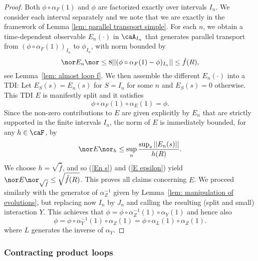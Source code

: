 \begin{proof}
	Both $\phi \circ \alpha_{F}(1)$ and $\phi$ are factorized exactly over intervals $I_n$. We consider each interval separately and we note that we are exactly in the framework of Lemma \ref{lem: parallel transport simple}. For each $n$, we obtain a time-dependent observable $E_{n}(\cdot)$ in $ \caA_{I_n}$
	that generates parallel transport from $(\phi \circ \alpha_{F}(1))_{I_n}$ to $\phi_{I_n}$, with norm bounded by 
	\begin{equation}\label{En s}
	\nor E_n \nor \leq 8 || (\phi \circ \alpha_{F}(1)-\phi)_{I_n}    || \leq  \hat{f}(R),
	\end{equation}
	see Lemma~\ref{lem: almost loop f}. We then assemble the different $E_n(\cdot)$ into a TDI: Let $
	E_S(s)= E_n(s) $ for $S=I_n$ for some $n$ and $E_S(s)=0$ otherwise.
	This TDI $E$ is manifestly split and it satisfies
	$$
	\phi \circ \alpha_{F}(1) \circ \alpha_E(1)=\phi.
	$$
	Since the non-zero contributions to $E$ are given explicitly by $E_n$ that are strictly supported in the finite intervals $I_n$, the norm of $E$ is immediately bounded, for any $h \in \caF$, by
	\begin{equation}\label{E epsilon}
	\nor E \nor_h\leq \sup_n \frac{\sup_{s}||E_n(s)||}{h(R)}.
	\end{equation}
	We choose $h=\sqrt{\hat{f}}$, and so (\ref{En s}) and (\ref{E epsilon}) yield $\nor E \nor_{\sqrt{\hat{f}}}\leq \sqrt{\hat{f}(R)}$. This proves all claims concerning $E$.
	We proceed similarly with the generator of $\alpha_Z^{-1}$ given by Lemma~\ref{lem: manipulation of evolutions}, but replacing now $I_n$ by $J_n$ and calling the resulting (split and small) interaction $Y$. This achieves that $\phi = \phi  \circ \alpha_{Z}^{-1}(1) \circ \alpha_{Y}(1) 
	$ and hence also 
	$$
	\phi = \phi  \circ \alpha_{Y}^{-1}(1) \circ \alpha_{Z}(1) 
	= \phi  \circ \alpha_{L}(1) \circ \alpha_{Z}(1).
	$$
	where $L$ generates the inverse of $\alpha_Y$.
\end{proof}


\subsubsection{Contracting product loops}

